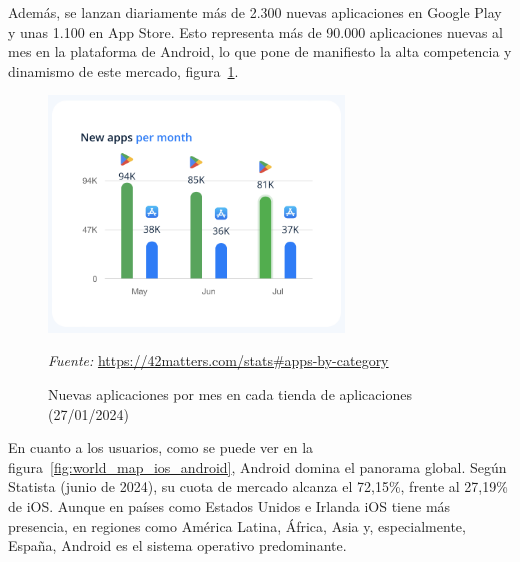 Además, se lanzan diariamente más de 2.300 nuevas aplicaciones en Google Play y unas 1.100 en App Store. Esto representa más de 90.000 aplicaciones nuevas al mes en la plataforma de Android, lo que pone de manifiesto la alta competencia y dinamismo de este mercado, figura~\ref{fig:apps_per_month}.

\begin{figure}[H]
\centering
\includegraphics[width=0.7\textwidth]{./img/intro/apps_per_month.png}
\caption{Nuevas aplicaciones por mes en cada tienda de aplicaciones (27/01/2024)}
\label{fig:apps_per_month}
\vspace{0.2em}
{\footnotesize \centering \textit{Fuente:} \url{https://42matters.com/stats#apps-by-category} \par}
\end{figure}

En cuanto a los usuarios, como se puede ver en la figura~\ref{fig:world_map_ios_android}, Android domina el panorama global. Según Statista (junio de 2024), su cuota de mercado alcanza el 72,15\%, frente al 27,19\% de iOS. Aunque en países como Estados Unidos e Irlanda iOS tiene más presencia, en regiones como América Latina, África, Asia y, especialmente, España, Android es el sistema operativo predominante.

